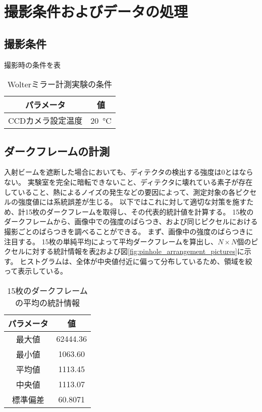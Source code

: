 \section{撮影条件およびデータの処理}

\subsection{撮影条件}
撮影時の条件を表

\begin{table}[!ht]
\begin{center}
  \caption{Wolterミラー計測実験の条件}
  \begin{tabular}{|c|c|} \hline
    パラメータ & 値 \\ \hline
    CCDカメラ設定温度 & \SI{20}{\degreeCelsius}  \\ \hline
  \end{tabular}
  \label{tb:mirror_experiment_params}
\end{center}
\end{table}

\subsection{ダークフレームの計測}
\label{chap5_darkflame_measurement}

入射ビームを遮断した場合においても、ディテクタの検出する強度は0とはならない。
実験室を完全に暗転できないこと、ディテクタに壊れている素子が存在していること、熱によるノイズの発生などの要因によって、測定対象の各ピクセルの強度値には系統誤差が生じる。
以下ではこれに対して適切な対策を施すため、計15枚のダークフレームを取得し、その代表的統計値を計算する。
15枚のダークフレームから、画像中での強度のばらつき、および同じピクセルにおける撮影ごとのばらつきを調べることができる。
まず、画像中の強度のばらつきに注目する。
15枚の単純平均によって平均ダークフレームを算出し、$N \times N$個のピクセルに対する統計情報を表\ref{tb:darkflame_average_data}および図\ref{fig:pinhole_arrangement_pictures}に示す。
ヒストグラムは、全体が中央値付近に偏って分布しているため、領域を絞って表示している。

\begin{table}[!ht]
\begin{center}
  \caption{15枚のダークフレームの平均の統計情報}
  \begin{tabular}{|c|c|} \hline
    パラメータ & 値 \\ \hline
    最大値 & 62444.36 \\
    最小値 & 1063.60 \\
    平均値 & 1113.45 \\
    中央値 & 1113.07 \\
    標準偏差 & 60.8071 \\ \hline
  \end{tabular}
  \label{tb:darkflame_average_data}
\end{center}
\end{table}

